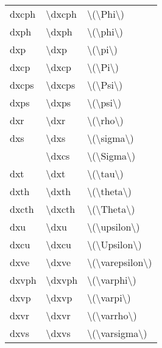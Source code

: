\begin{longtable}{>{\footnotesize}p{15mm}>{\footnotesize}p{15mm}>{\footnotesize}p{95mm}}
dxcph           & \textbackslash dxcph     & \textbackslash (\textbackslash Phi\textbackslash ) \\
dxph            & \textbackslash dxph      & \textbackslash (\textbackslash phi\textbackslash ) \\
dxp             & \textbackslash dxp       & \textbackslash (\textbackslash pi\textbackslash ) \\
dxcp            & \textbackslash dxcp      & \textbackslash (\textbackslash Pi\textbackslash ) \\
dxcps           & \textbackslash dxcps     & \textbackslash (\textbackslash Psi\textbackslash ) \\
dxps            & \textbackslash dxps      & \textbackslash (\textbackslash psi\textbackslash ) \\
dxr             & \textbackslash dxr       & \textbackslash (\textbackslash rho\textbackslash ) \\
dxs             & \textbackslash dxs       & \textbackslash (\textbackslash sigma\textbackslash ) \\
                & \textbackslash dxcs      & \textbackslash (\textbackslash Sigma\textbackslash ) \\
dxt             & \textbackslash dxt       & \textbackslash (\textbackslash tau\textbackslash ) \\
dxth            & \textbackslash dxth      & \textbackslash (\textbackslash theta\textbackslash ) \\
dxcth           & \textbackslash dxcth     & \textbackslash (\textbackslash Theta\textbackslash ) \\
dxu             & \textbackslash dxu       & \textbackslash (\textbackslash upsilon\textbackslash ) \\
dxcu            & \textbackslash dxcu      & \textbackslash (\textbackslash Upsilon\textbackslash ) \\
dxve            & \textbackslash dxve      & \textbackslash (\textbackslash varepsilon\textbackslash ) \\
dxvph           & \textbackslash dxvph     & \textbackslash (\textbackslash varphi\textbackslash ) \\
dxvp            & \textbackslash dxvp      & \textbackslash (\textbackslash varpi\textbackslash ) \\
dxvr            & \textbackslash dxvr      & \textbackslash (\textbackslash varrho\textbackslash ) \\
dxvs            & \textbackslash dxvs      & \textbackslash (\textbackslash varsigma\textbackslash ) \\

\end{longtable}
